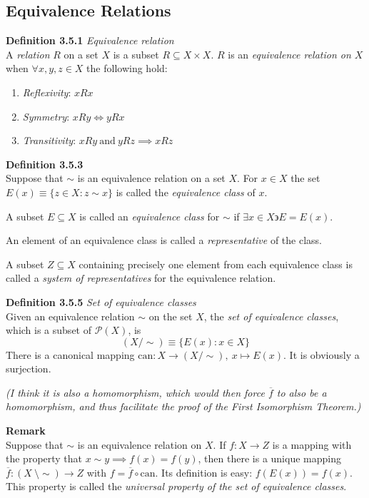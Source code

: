 \documentclass[8pt,landscape]{article}
\begin{document}
\begin{multicols}{3}
    \subsection{Equivalence Relations}

    \textbf{Definition 3.5.1} \emph{Equivalence relation} \\
    A \emph{relation} $R$ on a set $X$ is a subset $R \subseteq X \times X$.
    $R$ is an \emph{equivalence relation on $X$} when $\forall x,y,z \in X$
    the following hold:
    \begin{enumerate}
        \item \emph{Reflexivity}: $xRx$
        \item \emph{Symmetry}: $xRy \iff yRx$
        \item \emph{Transitivity}: $xRy \ \text{and} \ yRz \implies xRz$
    \end{enumerate}

    \textbf{Definition 3.5.3} \\
    Suppose that $\sim$ is an equivalence relation on a set $X$.
    For $x \in X$ the set $E(x) \equiv \{z \in X : z\sim x\}$ is called the
    \emph{equivalence class} of $x$.

    A subset $E \subseteq X$ is called an \emph{equivalence class} for $\sim$ if
    $\exists x \in X \backepsilon E=E(x)$.

    An element of an equivalence class is called a \emph{representative} of the class.

    A subset $Z \subseteq X$ containing precisely one element from each equivalence
    class is called a \emph{system of representatives} for the equivalence relation.

    \textbf{Definition 3.5.5} \emph{Set of equivalence classes} \\
    Given an equivalence relation $\sim$ on the set $X$, the
    \emph{set of equivalence classes}, which is a subset of $\mathcal{P}(X)$, is
    \[
        (X/\sim) \equiv \{E(x) : x \in X\}
    \]
    There is a canonical mapping $\mathrm{can} : X \to (X/\sim), \ x \mapsto E(x)$.
    It is obviously a surjection.

    \emph{(I think it is also a homomorphism,
        which would then force $\overline{f}$ to also be a homomorphism,
    and thus facilitate the proof of the First Isomorphism Theorem.)}

    \textbf{Remark} \\
    Suppose that $\sim$ is an equivalence relation on $X$.
    If $f : X \to Z$ is a mapping with the property that $x \sim y
    \implies f(x) = f(y)$,
    then there is a unique mapping $\overline{f} : (X \ \setminus \sim) \to Z$
    with $f = \overline{f} \circ \mathrm{can}$.
    Its definition is easy: $f(E(x)) = f(x)$.
    This property is called the \emph{universal property of the set of equivalence
    classes}.


\end{multicols}
\end{document}
